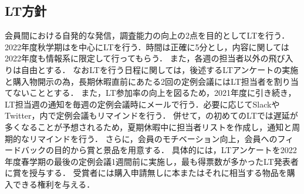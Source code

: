 \subsection*{LT方針}


会員間における自発的な発信，調査能力の向上の2点を目的としてLTを行う．
2022年度秋学期は\firstGrade{}を中心にLTを行う．時間は正確に5分とし，内容に関しては2022年度も情報系に限定して行ってもらう．
また，各週の担当者以外の飛び入りは自由とする．
なおLTを行う日程に関しては，後述するLTアンケートの実施と購入物開示の為，長期休暇直前にあたる2回の定例会議にはLT担当者を割り当てないこととする．
また，LT参加率の向上を図るため，2021年度に引き続き，LT担当週の通知を毎週の定例会議時にメールで行う．必要に応じてSlackやTwitter，内で定例会議もリマインドを行う．
併せて，\firstGrade{}の初めてのLTでは遅延が多くなることが予想されるため，夏期休暇中に担当者リストを作成し，通知と周期的なリマインドを行う．
さらに，会員のモチベーション向上，会員へのフィードバックの目的から賞と景品を用意する．
具体的には，LTアンケートを2022年度春学期の最後の定例会議1週間前に実施し，最も得票数が多かったLT発表者に賞を授与する．
受賞者には購入申請無しに本またはそれに相当する物品を購入できる権利を与える．
